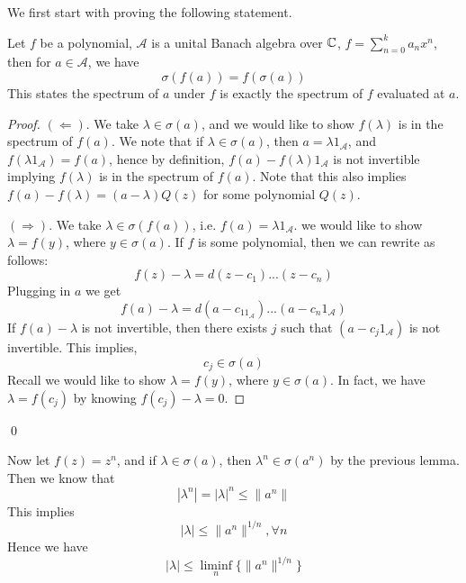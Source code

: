 We first start with proving the following statement.
\begin{lemma}
    Let $f$ be a polynomial, $\mathcal{A}$ is a unital Banach algebra over $\mathbb{C}$, $f=\sum_{n=0}^ka_nx^n$, then for $a\in\mathcal{A}$, we have
    \begin{equation*}
        \sigma(f(a))=f(\sigma(a))
    \end{equation*}
    This states the spectrum of $a$ under $f$ is exactly the spectrum of $f$ evaluated at $a$.
\end{lemma}
\begin{proof}
    $(\Leftarrow)$. We take $\lambda\in\sigma(a)$, and we would like to show $f(\lambda)$ is in the spectrum of $f(a)$. We note that if $\lambda\in\sigma(a)$, then $a=\lambda1_\mathcal{A}$, and $f(\lambda1_\mathcal{A})=f(a)$, hence by definition, $f(a)-f(\lambda)1_\mathcal{A}$ is not invertible implying $f(\lambda)$ is in the spectrum of $f(a)$. Note that this also implies $f(a)-f(\lambda)=(a-\lambda)Q(z)$ for some polynomial $Q(z)$.

    $(\Rightarrow)$. We take $\lambda\in\sigma(f(a))$, i.e. $f(a)=\lambda1_\mathcal{A}$. we would like to show $\lambda=f(y)$, where $y\in\sigma(a)$. If $f$ is some polynomial, then we can rewrite as follows:
    \begin{equation*}
        f(z)-\lambda=d(z-c_1)...(z-c_n)
    \end{equation*}
    Plugging in $a$ we get
    \begin{equation*}
        f(a)-\lambda=d(a-c_11_\mathcal{A})...(a-c_n1_\mathcal{A})
    \end{equation*}
    If $f(a)-\lambda$ is not invertible, then there exists $j$ such that $(a-c_j1_\mathcal{A})$ is not invertible. This implies,
    \begin{equation*}
        c_j\in\sigma(a)
    \end{equation*}
    Recall we would like to show $\lambda=f(y)$, where $y\in\sigma(a)$. In fact, we have $\lambda=f(c_j)$ by knowing $f(c_j)-\lambda=0$. 
\end{proof}
\qed

Now let $f(z)=z^n$, and if $\lambda\in\sigma(a)$, then $\lambda^n\in\sigma(a^n)$ by the previous lemma. Then we know that 
\begin{equation*}
    |\lambda^n|=|\lambda|^n\leq\|a^n\|
\end{equation*}
This implies
\begin{equation*}
    |\lambda|\leq\|a^n\|^{1/n}, \forall n
\end{equation*}
Hence we have
\begin{equation*}
    |\lambda|\leq\liminf_n\{\|a^n\|^{1/n}\}
\end{equation*}

